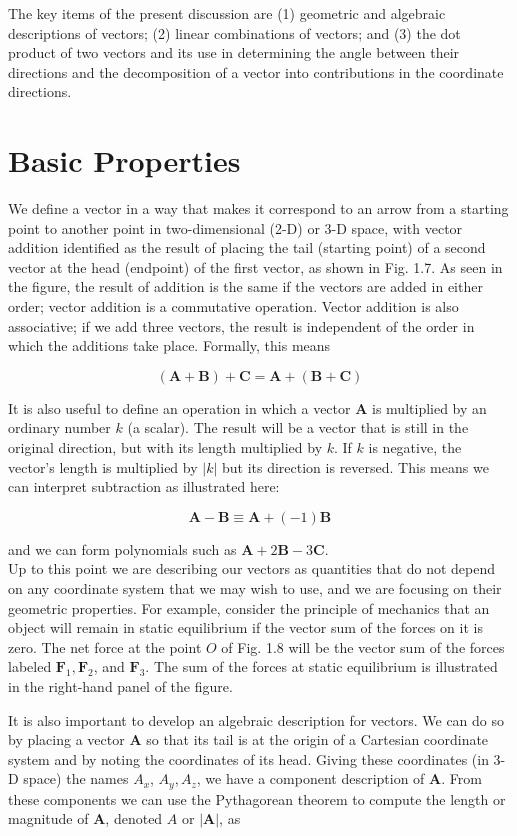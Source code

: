 \documentclass[10pt]{article}
\begin{document}
The key items of the present discussion are (1) geometric and algebraic descriptions of vectors; (2) linear combinations of vectors; and (3) the dot product of two vectors and its use in determining the angle between their directions and the decomposition of a vector into contributions in the coordinate directions.

\section*{Basic Properties}
We define a vector in a way that makes it correspond to an arrow from a starting point to another point in two-dimensional (2-D) or 3-D space, with vector addition identified as the result of placing the tail (starting point) of a second vector at the head (endpoint) of the first vector, as shown in Fig. 1.7. As seen in the figure, the result of addition is the same if the vectors are added in either order; vector addition is a commutative operation. Vector addition is also associative; if we add three vectors, the result is independent of the order in which the additions take place. Formally, this means

$$
(\mathbf{A}+\mathbf{B})+\mathbf{C}=\mathbf{A}+(\mathbf{B}+\mathbf{C})
$$

It is also useful to define an operation in which a vector $\mathbf{A}$ is multiplied by an ordinary number $k$ (a scalar). The result will be a vector that is still in the original direction, but with its length multiplied by $k$. If $k$ is negative, the vector's length is multiplied by $|k|$ but its direction is reversed. This means we can interpret subtraction as illustrated here:

$$
\mathbf{A}-\mathbf{B} \equiv \mathbf{A}+(-1) \mathbf{B}
$$

and we can form polynomials such as $\mathbf{A}+2 \mathbf{B}-3 \mathbf{C}$.\\
Up to this point we are describing our vectors as quantities that do not depend on any coordinate system that we may wish to use, and we are focusing on their geometric properties. For example, consider the principle of mechanics that an object will remain in static equilibrium if the vector sum of the forces on it is zero. The net force at the point $O$ of Fig. 1.8 will be the vector sum of the forces labeled $\mathbf{F}_{1}, \mathbf{F}_{2}$, and $\mathbf{F}_{3}$. The sum of the forces at static equilibrium is illustrated in the right-hand panel of the figure.

It is also important to develop an algebraic description for vectors. We can do so by placing a vector $\mathbf{A}$ so that its tail is at the origin of a Cartesian coordinate system and by noting the coordinates of its head. Giving these coordinates (in 3-D space) the names $A_{x}$, $A_{y}, A_{z}$, we have a component description of $\mathbf{A}$. From these components we can use the Pythagorean theorem to compute the length or magnitude of $\mathbf{A}$, denoted $A$ or $|\mathbf{A}|$, as
\end{document}
